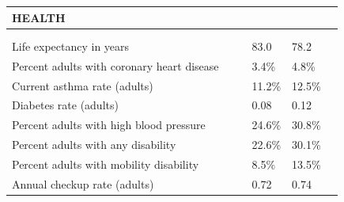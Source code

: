 \documentclass[9pt]{report}
\begin{document}
\newpage
\setlength{\tabcolsep}{.01in} %
\begin{tabular}{p{.10in}p{.10in}p{.10in}p{3.7in}>{\hfill}p{.85in}>{\hfill}p{.85in}>{\hfill}p{.85in}>{\hfill}p{.85in}p{0.1in}}
\multicolumn{9}{l}{\parbox{7.1in}{\raggedright{\large{\strut\textbf{HEALTH}\strut}}}} \\ 
\hline
\multicolumn{4}{l}{\parbox{3.5in}{\raggedright{\textbf{}}}} & \multicolumn{1}{r}{\parbox{.85in}{\strut\raggedleft{\textbf{}\strut}}} & \multicolumn{1}{r}{\parbox{.85in}{\strut\raggedleft{\textbf{}\strut}}} & \multicolumn{1}{r}{\parbox{.85in}{\strut{}}} & \multicolumn{1}{r}{\parbox{.85in}{\strut{}}} & \\ 
\multicolumn{9}{l}{} \\ 
\multicolumn{4}{l}{\parbox{3.6in}{\strut\raggedright{{Life expectancy in years}}\strut}} &  &  & 83.0 & 78.2 & \multicolumn{1}{l}{}  \\ 
\multicolumn{4}{l}{\parbox{3.6in}{\strut\raggedright{{Percent adults with coronary heart disease}}\strut}} &  &  & 3.4\% & 4.8\% & \multicolumn{1}{l}{}  \\ 
\multicolumn{4}{l}{\parbox{3.6in}{\strut\raggedright{{Current asthma rate (adults)}}\strut}} &  &  & 11.2\% & 12.5\% & \multicolumn{1}{l}{}  \\ 
\multicolumn{4}{l}{\parbox{3.6in}{\strut\raggedright{{Diabetes rate (adults)}}\strut}} &  &  & 0.08 & 0.12 & \multicolumn{1}{l}{}  \\ 
\multicolumn{4}{l}{\parbox{3.6in}{\strut\raggedright{{Percent adults with high blood pressure}}\strut}} &  &  & 24.6\% & 30.8\% & \multicolumn{1}{l}{}  \\ 
\multicolumn{4}{l}{\parbox{3.6in}{\strut\raggedright{{Percent adults with any disability}}\strut}} &  &  & 22.6\% & 30.1\% & \multicolumn{1}{l}{}  \\ 
\multicolumn{4}{l}{\parbox{3.6in}{\strut\raggedright{{Percent adults with mobility disability}}\strut}} &  &  & 8.5\% & 13.5\% & \multicolumn{1}{l}{}  \\ 
\multicolumn{4}{l}{\parbox{3.6in}{\strut\raggedright{{Annual checkup rate (adults)}}\strut}} &  &  & 0.72 & 0.74 & \multicolumn{1}{l}{}  \\ 

\end{tabular}
\end{document}
